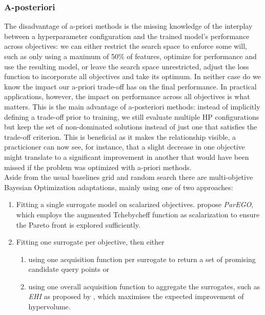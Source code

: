 \documentclass[twoside,11pt]{article}
\begin{document}
\subsubsection{A-posteriori}
\label{sec-moo-post}
The disadvantage of a-priori methods is the missing knowledge of the interplay between a hyperparameter configuration and the trained model's
performance across objectives:
we can either restrict the search space to enforce some will, such as only using a maximum of 50\% of features, optimize for performance and use the
resulting model, or leave the search space unrestricted, adjust the loss function to incorporate all objectives and take its optimum.
In neither case do we know the impact our a-priori trade-off has on the final performance.
In practical applications, however, the impact on performance across all objectives is what matters.
This is the main advantage of a-posteriori methods: instead of implicitly defining a trade-off prior to training, we still evaluate multiple HP configurations
but keep the set of non-dominated solutions instead of just one that satisfies the trade-off criterion.
This is beneficial as it makes the relationship visible, a practicioner can now see, for instance, that a slight decrease in one objective might translate to
a significant improvement in another that would have been missed if the problem was optimized with a-priori methods.
\\
Aside from the usual baselines grid and random search there are multi-objetive Bayesian Optimization adaptations, mainly using one of two approaches:
\begin{enumerate}[label*=\arabic*.]
  \item Fitting a single surrogate model on scalarized objectives. \citet[pp. 54-56]{ParEGO} propose \textit{ParEGO}, which employs the augmented Tchebycheff function as
        scalarization to ensure the Pareto front is explored sufficiently.
  \item Fitting one surrogate per objective, then either 
  \begin{enumerate}[label*=\arabic*.]
    \item using one acquisition function per surrogate to return a set of promising candidate query points or
    \item using one overall acquisition function to aggregate the surrogates, such as \textit{EHI} as proposed by \citet[pp. 8f]{EHI}, which maximises
          the expected improvement of hypervolume.
  \end{enumerate}
\end{enumerate}
\end{document}

